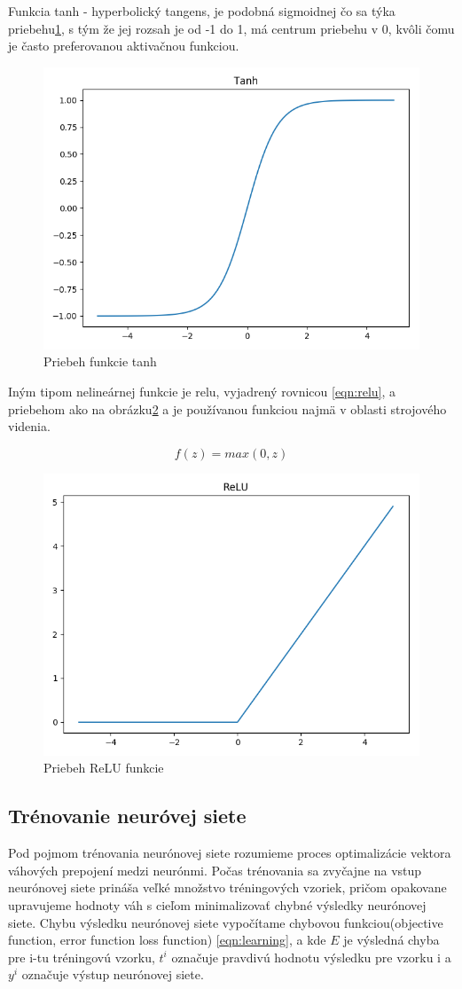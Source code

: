 Funkcia tanh - hyperbolický tangens, je podobná sigmoidnej čo sa týka priebehu\ref{fig:tanh}, s tým že jej rozsah je od -1 do 1, má centrum priebehu v 0, kvôli čomu je často preferovanou aktivačnou funkciou.

\begin{figure}[H]
	\centering
	\includegraphics[width=0.5\linewidth]{img/tanh}
	\caption{Priebeh funkcie tanh}
	\label{fig:tanh}
\end{figure}

Iným tipom nelineárnej funkcie je \acrshort{relu}, vyjadrený rovnicou \eqref{eqn:relu}, a priebehom ako na obrázku\ref{fig:relu} a je používanou funkciou najmä v oblasti strojového videnia.

\begin{equation}\label{eqn:relu}
f(z) = max(0, z)
\end{equation}

\begin{figure}[H]
	\centering
	\includegraphics[width=0.5\linewidth]{img/relu}
	\caption{Priebeh ReLU funkcie}
	\label{fig:relu}
\end{figure}

\subsection{Trénovanie neuróvej siete}
Pod pojmom trénovania neurónovej siete rozumieme proces optimalizácie vektora váhových prepojení medzi neurónmi.
Počas trénovania sa zvyčajne na vstup neurónovej siete prináša veľké množstvo tréningových vzoriek, pričom opakovane upravujeme hodnoty váh s cieľom minimalizovať chybné výsledky neurónovej siete.
Chybu výsledku neurónovej siete vypočítame chybovou funkciou(objective function, error function loss function) \eqref{eqn:learning}, a kde $E$ je výsledná chyba pre i-tu tréningovú vzorku, $t^{i}$ označuje pravdivú hodnotu výsledku pre vzorku i a $y^{i}$ označuje výstup neurónovej siete.

